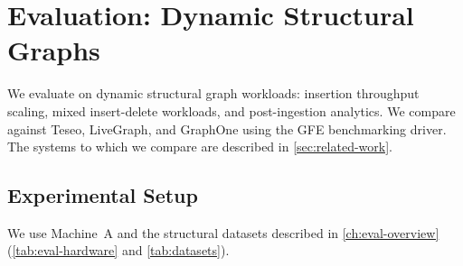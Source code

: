\chapter{Evaluation: Dynamic Structural Graphs}
\label{sec:eval:dynamic:chapter}

We evaluate \project{} on dynamic structural graph workloads: insertion throughput scaling, mixed insert-delete workloads, and post-ingestion analytics.
We compare against Teseo, LiveGraph, and GraphOne using the GFE benchmarking driver.
The systems to which we compare are described in \autoref{sec:related-work}.

\section{Experimental Setup}
\label{sec:eval:dynamic:setup}

We use Machine~A and the structural datasets described in \autoref{ch:eval-overview} (\autoref{tab:eval-hardware} and \autoref{tab:datasets}).









% 

